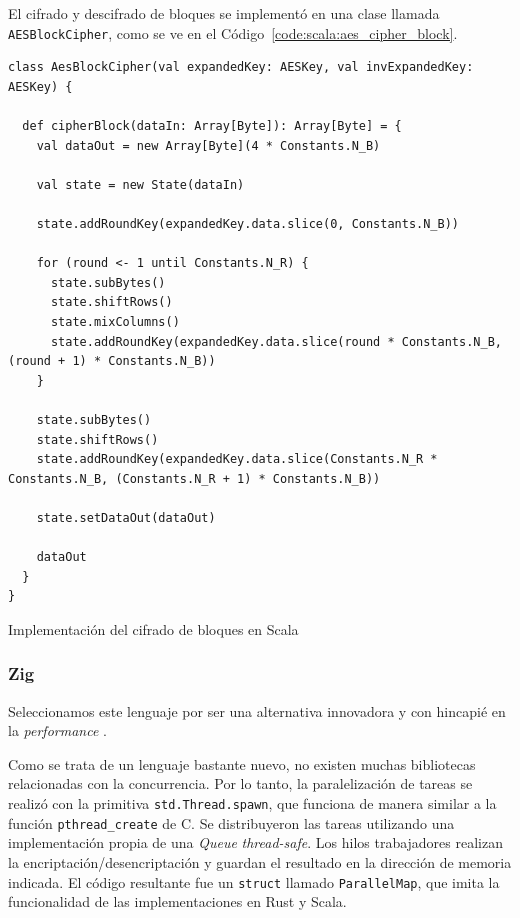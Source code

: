 \documentclass[11pt]{article}
\let\Oldsubsubsection\subsubsection
\renewcommand{\subsubsection}{\FloatBarrier\Oldsubsubsection}
\newcommand{\english}[1]{\textit{#1}}
\begin{document}
El cifrado y descifrado de bloques se implementó en una clase llamada \lstinline{AESBlockCipher}, como se ve en el Código~\ref{code:scala:aes_cipher_block}.

\begin{listing}[h]
\begin{verbatim}
class AesBlockCipher(val expandedKey: AESKey, val invExpandedKey: AESKey) {

  def cipherBlock(dataIn: Array[Byte]): Array[Byte] = {
    val dataOut = new Array[Byte](4 * Constants.N_B)

    val state = new State(dataIn)

    state.addRoundKey(expandedKey.data.slice(0, Constants.N_B))

    for (round <- 1 until Constants.N_R) {
      state.subBytes()
      state.shiftRows()
      state.mixColumns()
      state.addRoundKey(expandedKey.data.slice(round * Constants.N_B, (round + 1) * Constants.N_B))
    }

    state.subBytes()
    state.shiftRows()
    state.addRoundKey(expandedKey.data.slice(Constants.N_R * Constants.N_B, (Constants.N_R + 1) * Constants.N_B))

    state.setDataOut(dataOut)

    dataOut
  }
}
\end{verbatim}
\caption{Implementación del cifrado de bloques en Scala}
\label{code:scala:aes_cipher_block}
\end{listing}

\subsubsection{Zig}

Seleccionamos este lenguaje por ser una alternativa innovadora y con hincapié en la \english{performance} \cite{zig:ex:zig_in_100_sec}.

Como se trata de un lenguaje bastante nuevo, no existen muchas bibliotecas relacionadas con la concurrencia. Por lo tanto, la paralelización de tareas se realizó con la primitiva \lstinline{std.Thread.spawn}, que funciona de manera similar a la función \lstinline{pthread_create} de C. Se distribuyeron las tareas utilizando una implementación propia de una \english{Queue} \english{thread-safe}. Los hilos trabajadores realizan la encriptación/desencriptación y guardan el resultado en la dirección de memoria indicada. El código resultante fue un \lstinline{struct} llamado \lstinline{ParallelMap}, que imita la funcionalidad de las implementaciones en Rust y Scala.
\end{document}
